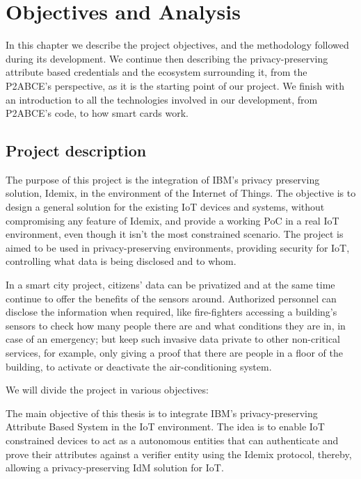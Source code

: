 \chapter{Objectives and Analysis}\label{ch:objectives}

In this chapter we describe the project objectives, and the methodology followed during its development. We continue then describing the privacy-preserving attribute based credentials and the ecosystem surrounding it, from the P2ABCE's perspective, as it is the starting point of our project. We finish with an introduction to all the technologies involved in our development, from P2ABCE's code, to how smart cards work.

\section{Project description}\label{objectives:section}

The purpose of this project is the integration of IBM's privacy preserving solution, Idemix, in the environment of the Internet of Things. The objective is to design a general solution for the existing IoT devices and systems, without compromising any feature of Idemix, and provide a working PoC in a real IoT environment, even though it isn't the most constrained scenario. The project is aimed to be used in privacy-preserving environments, providing security for IoT, controlling what data is being disclosed and to whom.

In a smart city project, citizens' data can be privatized and at the same time continue to offer the benefits of the sensors around. Authorized personnel can disclose the information when required, like fire-fighters accessing a building's sensors to check how many people there are and what conditions they are in, in case of an emergency; but keep such invasive data private to other non-critical services, for example, only giving a proof that there are people in a floor of the building, to activate or deactivate the air-conditioning system.

\hfil


We will divide the project in various objectives:

The main objective of this thesis is to integrate IBM’s privacy-preserving Attribute Based System in the IoT environment. The idea is to enable IoT constrained devices to act as a autonomous entities that can authenticate and prove their attributes against a verifier entity using the Idemix protocol, thereby, allowing a privacy-preserving IdM solution for IoT.

